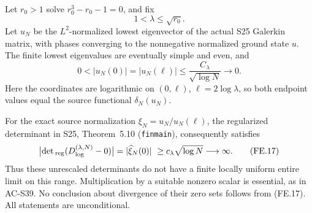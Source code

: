 \begin{theorem}
\label{AC-S40}
Let \(r_0>1\) solve \(r_0^3-r_0-1=0\), and fix
\[
                           1<\lambda\leq\sqrt{r_0}.       \tag{FE.15}
\]
Let \(u_N\) be the \(L^2\)-normalized lowest eigenvector of the
actual S25 Galerkin matrix, with phases converging to the nonnegative
normalized ground state \(u\).  The finite lowest eigenvalues are
eventually simple and even, and
\[
 0<|u_N(0)|=|u_N(\ell)|
                       \leq \frac{C_\lambda}{\sqrt{\log N}}
                       \longrightarrow0.                \tag{FE.16}
\]
Here the coordinates are logarithmic on \((0,\ell)\),
\(\ell=2\log\lambda\), so both endpoint values equal the
source functional \(\delta_N(u_N)\).

For the exact source normalization
\(\xi_N=u_N/u_N(\ell)\), the regularized determinant
in S25, Theorem~5.10 (\texttt{finmain}), consequently satisfies
\[
 \bigl|\det{}_{\rm reg}(D^{(\lambda,N)}_{\log}-0)\bigr|
       =|\widehat\xi_N(0)|\ \geq c_\lambda\sqrt{\log N}
                       \longrightarrow\infty.            \tag{FE.17}
\]
Thus these unrescaled determinants do not have a finite locally
uniform entire limit on this range.  Multiplication by a suitable
nonzero scalar is essential, as in AC-S39.  No conclusion about
divergence of their zero sets follows from (FE.17).
All statements are unconditional.
\end{theorem}
